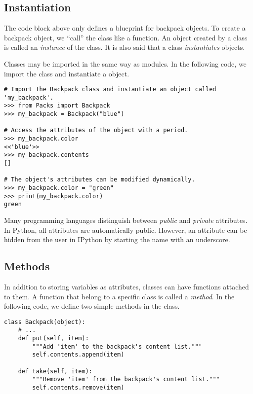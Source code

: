 \subsection*{Instantiation}

The  code block above only defines a blueprint for backpack objects.
To create a backpack object, we ``call'' the class like a function.
An object created by a class is called an \emph{instance} of the class.
It is also said that a class \emph{instantiates} objects.

Classes may be imported in the same way as modules.
In the following code, we import the  class and instantiate a  object.

\begin{lstlisting}
# Import the Backpack class and instantiate an object called 'my_backpack'.
>>> from Packs import Backpack
>>> my_backpack = Backpack("blue")

# Access the attributes of the object with a period.
>>> my_backpack.color
<<'blue'>>
>>> my_backpack.contents
[]

# The object's attributes can be modified dynamically.
>>> my_backpack.color = "green"
>>> print(my_backpack.color)
green
\end{lstlisting}

\begin{info}
Many programming languages distinguish between \emph{public} and \emph{private} attributes.
In Python, all attributes are automatically public.
However, an attribute can be hidden from the user in IPython by starting the name with an underscore. %
\end{info}

\subsection*{Methods}

In addition to storing variables as attributes, classes can have functions attached to them.
A function that belong to a specific class is called a \emph{method}.
In the following code, we define two simple methods in the  class.

\begin{lstlisting}
class Backpack(object):
    # ...
    def put(self, item):
        """Add 'item' to the backpack's content list."""
        self.contents.append(item)
    
    def take(self, item):
        """Remove 'item' from the backpack's content list."""
        self.contents.remove(item)
\end{lstlisting}

